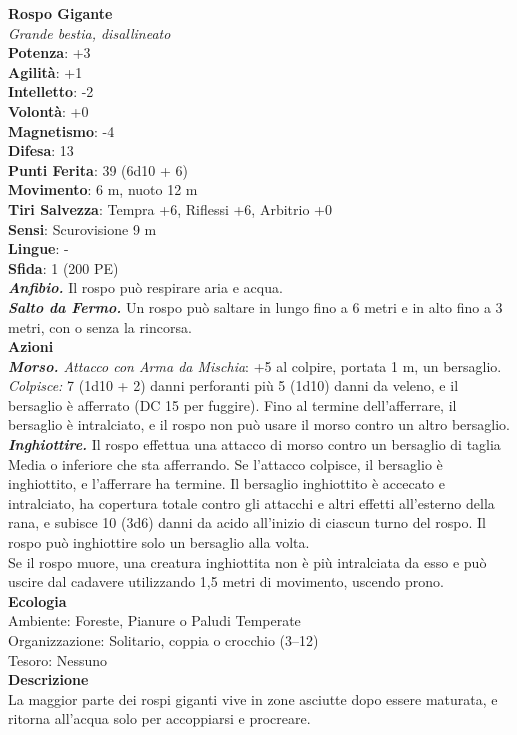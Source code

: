 \begin{multicols}{2}
\medskip\textbf{Rospo Gigante}\\
\emph{Grande bestia, disallineato}\\
\textbf{Potenza}: +3\\
\textbf{Agilità}: +1\\
\textbf{Intelletto}: -2\\
\textbf{Volontà}: +0\\
\textbf{Magnetismo}: -4\\
\textbf{Difesa}: 13\\
\textbf{Punti Ferita}: 39 (6d10 + 6)\\
\textbf{Movimento}: 6 m, nuoto 12 m\\
\textbf{Tiri Salvezza}: Tempra +6, Riflessi +6, Arbitrio +0\\
\textbf{Sensi}: Scurovisione 9 m\\
\textbf{Lingue}: -\\
\textbf{Sfida}: 1 (200 PE)\smallskip\\
\emph{\textbf{Anfibio.}} Il rospo può respirare aria e acqua.\\
\emph{\textbf{Salto da Fermo.}} Un rospo può saltare in lungo fino a 6 metri e in alto fino a 3 metri, con o senza la rincorsa.\\
\smallskip\textbf{Azioni}\\
\emph{\textbf{Morso.} Attacco con Arma da Mischia}: +5 al colpire, portata 1 m, un bersaglio.\\

\emph{Colpisce:} 7 (1d10 + 2) danni perforanti più 5 (1d10) danni da veleno, e il bersaglio è afferrato (DC  15 per fuggire). Fino al termine dell'afferrare, il bersaglio è intralciato, e il rospo non può usare il morso contro un altro bersaglio.  \\
\emph{\textbf{Inghiottire.}} Il rospo effettua una attacco di morso contro un bersaglio di taglia Media o inferiore che sta afferrando. Se l'attacco colpisce, il bersaglio è inghiottito, e l'afferrare ha termine. Il bersaglio inghiottito è accecato e intralciato, ha copertura totale contro gli attacchi e altri effetti all'esterno della rana, e subisce 10 (3d6) danni da acido all'inizio di ciascun turno del rospo. Il rospo può inghiottire solo un bersaglio alla volta.\\
Se il rospo muore, una creatura inghiottita non è più intralciata da esso e può uscire dal cadavere utilizzando 1,5 metri di movimento, uscendo prono.\\
\textbf{Ecologia}\\
Ambiente: Foreste, Pianure o Paludi Temperate\\
Organizzazione: Solitario, coppia o crocchio (3–12)\\
Tesoro: Nessuno\\
\textbf{Descrizione}\\
La maggior parte dei rospi giganti vive in zone asciutte dopo essere maturata, e ritorna all’acqua solo per accoppiarsi e procreare.\\


\end{multicols}

